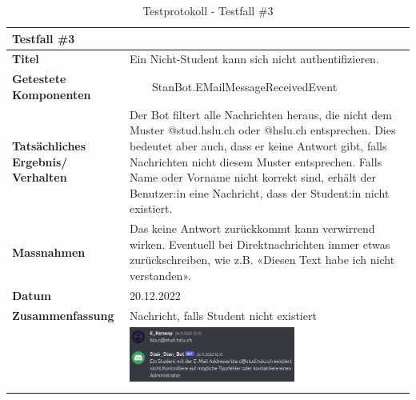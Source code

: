\documentclass[a4paper, table]{article}
\newcommand{\tabitem}{~~\llap{\textbullet}~~}
\begin{document}
\begin{longtable}[h]{|p{9em}|p{31em}|}
    \hline
    \multicolumn{2}{|l|}{\textbf{Testfall \#3}} \\
    \hline
    \textbf{Titel} & Ein Nicht-Student kann sich nicht authentifizieren. \\
    \hline
    \textbf{Getestete Komponenten} &  \tabitem StanBot.EMailMessageReceivedEvent \\
    \hline
    \textbf{Tatsächliches Ergebnis/ Verhalten} & 
        Der Bot filtert alle Nachrichten heraus, die nicht dem Muster @stud.hslu.ch oder @hslu.ch entsprechen.
        Dies bedeutet aber auch, dass er keine Antwort gibt, falls Nachrichten nicht diesem Muster entsprechen.
        Falls Name oder Vorname nicht korrekt sind, erhält der Benutzer:in eine Nachricht, dass der Student:in nicht existiert. \\
    \hline
    \textbf{Massnahmen} & 
        Das keine Antwort zurückkommt kann verwirrend wirken. 
        Eventuell bei Direktnachrichten immer etwas zurückschreiben, wie z.B. «Diesen Text habe ich nicht verstanden». \\
    \hline
    \textbf{Datum} & 20.12.2022\\
    \hline
    \textbf{Zusammenfassung} & 
        Nachricht, falls Student nicht existiert \\*
     &  \includegraphics[width=0.6\textwidth]{img/Tests/3_Test_StudentNotFound.png} \\
    \hline
    \caption{Testprotokoll - Testfall \#3}
\end{longtable}
\end{document}
